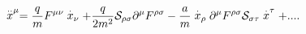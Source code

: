 \begin{equation}
\stackrel{..}{x}^{\mu }=\frac{q}{m}F^{\mu \nu }\stackrel{.}{x}_{\nu }+\frac{q%
}{2m^{2}}\mathcal{S}_{\rho \sigma }\partial ^{\mu }F^{\rho \sigma }-\frac{a}{%
m}\stackrel{.}{x}_{\rho }\partial ^{\mu }F^{\rho \sigma }\mathcal{S}_{\sigma
\tau }\stackrel{.}{x}^{\tau }+....
\end{equation}

